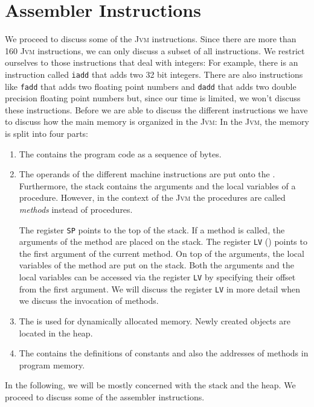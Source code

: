 \section{Assembler Instructions}
We proceed to discuss some of the \textsc{Jvm} instructions.  Since there are more than 160
\textsc{Jvm} instructions, we can only discuss a subset of all instructions.  We restrict ourselves to those
instructions that deal with integers:  For example, there is an instruction called \texttt{iadd} that adds
two 32 bit integers.  There are also instructions like \texttt{fadd} that adds two floating point
numbers and \texttt{dadd} that adds two double precision floating point numbers but, since our time
is limited, we won't discuss these instructions.  Before we are able to discuss the different
instructions we have to discuss how the main memory is organized in the \textsc{Jvm}: In the
\textsc{Jvm}, the memory is split into four parts: 
\begin{enumerate}
\item The  contains the program code as a sequence of bytes.
\item The operands of the different machine instructions are put onto the .
      Furthermore, the stack contains the arguments and the local variables of a procedure.
      However, in the context of the \textsc{Jvm} the procedures are called \emph{methods} instead
      of procedures.

      The register \texttt{SP} points to the top of the stack.
      If a method is called, the arguments of the method are placed on the stack.  
      The register \texttt{LV} () points to the first argument of the current  
      method.    On top of the arguments, the local variables of the method are put on the stack.
      Both the arguments and the local variables can be accessed via the register \texttt{LV}
      by specifying their offset from the first argument.
      We will discuss the register \texttt{LV} in more detail when we discuss the invocation of methods. 
\item The  is used for dynamically allocated memory.  Newly created objects are
      located in the heap.
\item The  contains the definitions of constants and also the addresses of
      methods in program memory.
\end{enumerate}
In the following, we will be mostly concerned with the stack and the heap.
We proceed to discuss some of the assembler instructions.

